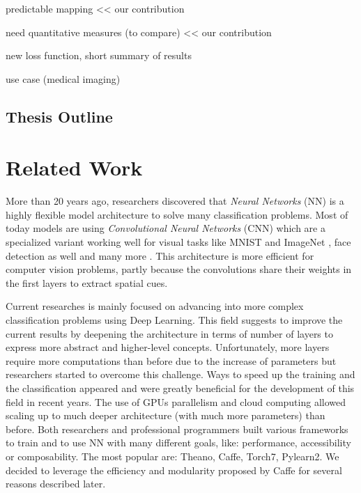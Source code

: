 \documentclass[a4paper,12pt]{report}
\begin{document}
predictable mapping << our contribution

need quantitative measures (to compare) << our contribution

new loss function, short summary of results

use case (medical imaging)

\section{Thesis Outline}


\chapter{Related Work}

More than 20 years ago, researchers discovered that {\em Neural Networks} (NN) is a highly flexible model architecture to solve many classification problems.
Most of today models are using {\em Convolutional Neural Networks} (CNN) which are a specialized variant working well for visual tasks like MNIST \cite{mnist_web} and ImageNet \cite{krizhevsky2012imagenet}, face detection as well \cite{rowley1998neural} and many more \cite{prechelt1994proben1}.
This architecture is more efficient for computer vision problems, partly because the convolutions share their weights in the first layers to extract spatial cues.

Current researches is mainly focused on advancing into more complex classification problems using Deep Learning.
This field suggests to improve the current results by deepening the architecture in terms of number of layers to express more abstract and higher-level concepts.
Unfortunately, more layers require more computations than before due to the increase of parameters but researchers started to overcome this challenge.
Ways to speed up the training and the classification appeared and were greatly beneficial for the development of this field in recent years\cite{ciresan2011flexible}\cite{schmidhuber2015deep}\cite{nasse2009face}. %
The use of GPUs parallelism and cloud computing allowed scaling up to much deeper architecture (with much more parameters) than before\cite{coates2013deep}.
Both researchers and professional programmers built various frameworks to train and to use NN with many different goals, like: performance, accessibility or composability.
The most popular are: Theano\cite{bastien2012theano}, Caffe\cite{jia2014caffe}, Torch7\cite{collobert2011torch7}, Pylearn2\cite{goodfellow2013pylearn2}.
We decided to leverage the efficiency and modularity proposed by Caffe for several reasons described later.
\end{document}
